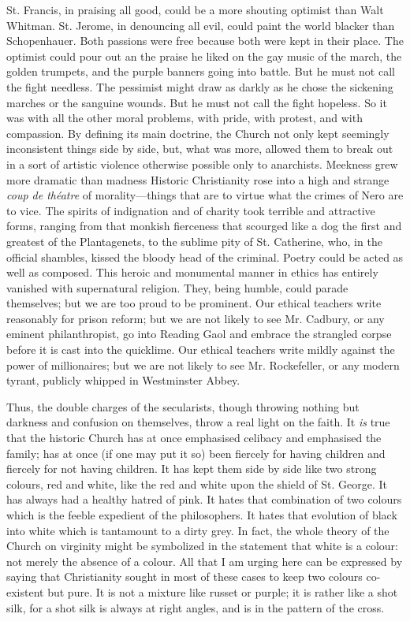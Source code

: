 \documentclass{book}
\begin{document}
St. Francis, in praising all good, could be a more shouting optimist than Walt Whitman. St. Jerome, in denouncing all evil, could paint the world blacker than Schopenhauer. Both passions were free because both were kept in their place. The optimist could pour out an the praise he liked on the gay music of the march, the golden trumpets, and the purple banners going into battle. But he must not call the fight needless. The pessimist might draw as darkly as he chose the sickening marches or the sanguine wounds. But he must not call the fight hopeless. So it was with all the other moral problems, with pride, with protest, and with compassion. By defining its main doctrine, the Church not only kept seemingly inconsistent things side by side, but, what was more, allowed them to break out in a sort of artistic violence otherwise possible only to anarchists. Meekness grew more dramatic than madness Historic Christianity rose into a high and strange \emph{coup de théatre} of morality—things that are to virtue what the crimes of Nero are to vice. The spirits of indignation and of charity took terrible and attractive forms, ranging from that monkish fierceness that scourged like a dog the first and greatest of the Plantagenets, to the sublime pity of St. Catherine, who, in the official shambles, kissed the bloody head of the criminal. Poetry could be acted as well as composed. This heroic and monumental manner in ethics has entirely vanished with supernatural religion. They, being humble, could parade themselves; but we are too proud to be prominent. Our ethical teachers write reasonably for prison reform; but we are not likely to see Mr. Cadbury, or any eminent philanthropist, go into Reading Gaol and embrace the strangled corpse before it is cast into the quicklime. Our ethical teachers write mildly against the power of millionaires; but we are not likely to see Mr. Rockefeller, or any modern tyrant, publicly whipped in Westminster Abbey.

Thus, the double charges of the secularists, though throwing nothing but darkness and confusion on themselves, throw a real light on the faith. It \emph{is} true that the historic Church has at once emphasised celibacy and emphasised the family; has at once (if one may put it so) been fiercely for having children and fiercely for not having children. It has kept them side by side like two strong colours, red and white, like the red and white upon the shield of St. George. It has always had a healthy hatred of pink. It hates that combination of two colours which is the feeble expedient of the philosophers. It hates that evolution of black into white which is tantamount to a dirty grey. In fact, the whole theory of the Church on virginity might be symbolized in the statement that white is a colour: not merely the absence of a colour. All that I am urging here can be expressed by saying that Christianity sought in most of these cases to keep two colours co-existent but pure. It is not a mixture like russet or purple; it is rather like a shot silk, for a shot silk is always at right angles, and is in the pattern of the cross.
\end{document}
